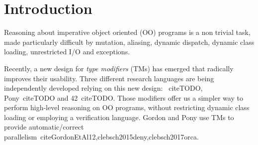 
\section{Introduction}
\saveSpace\saveSpace

Reasoning about imperative object oriented (OO) programs is a non trivial task,
made particularly difficult by mutation, aliasing, dynamic dispatch, dynamic class loading,
unrestricted I/O and exceptions.




Recently, a new design for \emph{type modifiers} (TMs) has emerged that radically improves their usability.
Three different research languages are being independently developed relying on this new design: ~cite{TODO}, Pony~cite{TODO} and 42~cite{TODO}. Those modifiers offer us a simpler way to perform high-level reasoning on OO programs, without restricting dynamic class loading or employing a verification language.
Gordon and Pony use TMs to provide automatic/correct parallelism~cite{GordonEtAl12,clebsch2015deny,clebsch2017orca}.

